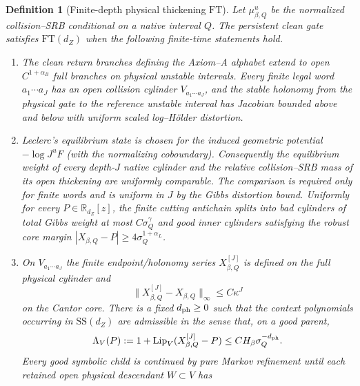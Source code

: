 \documentclass[11pt]{article}
\newtheorem{definition}[theorem]{Definition}
\begin{document}
\begin{definition}[Finite-depth physical thickening $\mathrm{FT}$]
\label{def:physical-legal-extension}
Let $\mu^u_{\beta,Q}$ be the normalized collision--SRB conditional on a
native interval $Q$.  The persistent clean gate satisfies
$\mathrm{FT}(d_Z)$ when the following finite-time statements hold.
\begin{enumerate}[label=\textup{(FT\arabic*)}]
\item The clean return branches defining the Axiom--A alphabet extend to
      open $C^{1+\alpha_B}$ full branches on physical unstable intervals.
      Every finite legal word $a_1\cdots a_J$ has an open collision cylinder
      $V_{a_1\cdots a_J}$, and the stable holonomy from the physical gate to
      the reference unstable interval has Jacobian bounded above and below
      with uniform scaled log--H\"older distortion.
\item Leclerc's equilibrium state is chosen for the induced geometric
      potential $-\log J^uF$ (with the normalizing coboundary).  Consequently
      the equilibrium weight of every depth-$J$ native cylinder and the
      relative collision--SRB mass of its open thickening are uniformly
      comparable.  The comparison is required only for finite words and is
      uniform in $J$ by the Gibbs distortion bound.
      Uniformly for every $P\in\mathbb R_{d_Z}[z]$, the finite cutting
      antichain splits into bad cylinders of total Gibbs weight at most
      $C\sigma_Q^\gamma$ and good inner cylinders satisfying the robust core
      margin $|X_{\beta,Q}-P|\ge4\sigma_Q^{1+\alpha_L}$.
\item On $V_{a_1\cdots a_J}$ the finite endpoint/holonomy series
      $X^{[J]}_{\beta,Q}$ is defined on the full physical cylinder and
      \begin{equation}
      \label{eq:finite-thickening-shadow-error}
       \|X^{[J]}_{\beta,Q}-X_{\beta,Q}\|_\infty\le C\kappa^J
      \end{equation}
      on the Cantor core.  There is a fixed $d_{\rm ph}\ge0$ such that the
      context polynomials occurring in $\mathrm{SS}(d_Z)$ are admissible in
      the sense that, on a good parent,
      \begin{equation}
      \label{eq:physical-lipschitz-mark}
       \Lambda_V(P):=1+\operatorname{Lip}_V(X^{[J]}_{\beta,Q}-P)
       \le CH_\beta\sigma_Q^{-d_{\rm ph}}.
      \end{equation}
      Every good symbolic child is continued by pure Markov refinement until
      each retained open physical descendant $W\subset V$ has

\end{enumerate}
\end{definition}
\end{document}
